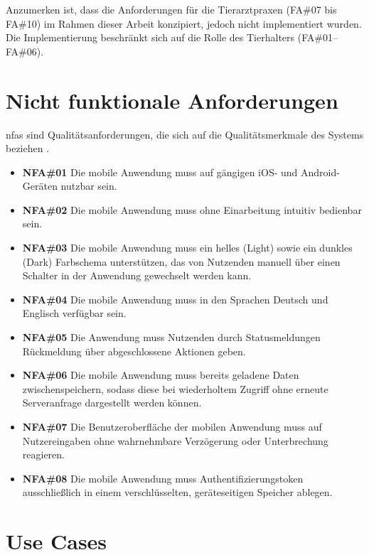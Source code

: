 Anzumerken ist, dass die Anforderungen für die Tierarztpraxen (FA\#07 bis FA\#10) im Rahmen dieser Arbeit konzipiert, jedoch nicht implementiert wurden. Die Implementierung beschränkt sich auf die Rolle des Tierhalters (FA\#01--FA\#06).

\section{Nicht funktionale Anforderungen}

\gls{nfas} sind Qualitätsanforderungen, die sich auf die Qualitätsmerkmale des Systems beziehen \cite[S.~4]{pohl2021}.

\begin{itemize}
    \item \textbf{NFA\#01} Die mobile Anwendung muss auf gängigen iOS- und Android-Geräten nutzbar sein.

    \item \textbf{NFA\#02} Die mobile Anwendung muss ohne Einarbeitung intuitiv bedienbar sein.

    \item \textbf{NFA\#03} Die mobile Anwendung muss ein helles (Light) sowie ein dunkles (Dark) Farbschema unterstützen, das von Nutzenden manuell über einen Schalter in der Anwendung gewechselt werden kann.

    \item \textbf{NFA\#04} Die mobile Anwendung muss in den Sprachen Deutsch und Englisch verfügbar sein.

    \item \textbf{NFA\#05} Die Anwendung muss Nutzenden durch Statusmeldungen Rückmeldung über abgeschlossene Aktionen geben.

     \item \textbf{NFA\#06} Die mobile Anwendung muss bereits geladene Daten zwischenspeichern, sodass diese bei wiederholtem Zugriff ohne erneute Serveranfrage dargestellt werden können.

    \item \textbf{NFA\#07} Die Benutzeroberfläche der mobilen Anwendung muss auf Nutzereingaben ohne wahrnehmbare Verzögerung oder Unterbrechung
    reagieren.

    \item \textbf{NFA\#08} Die mobile Anwendung muss Authentifizierungstoken ausschließlich in einem verschlüsselten, geräteseitigen Speicher ablegen.
\end{itemize}

\section{Use Cases}

